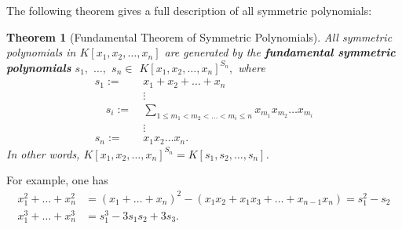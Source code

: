 \documentclass[11pt]{book}
\newtheorem{theorem}{Theorem}[section]
\begin{document}
The following theorem gives a full description of all symmetric polynomials:
\begin{theorem}[Fundamental Theorem of Symmetric Polynomials] \label{thm-FTSP}
All symmetric polynomials in $K[x_1, x_2, \dots, x_n]$ are generated by the {\bf fundamental symmetric polynomials} 
$s_1,$ $\dots,$ $s_n \in$ $K[x_1, x_2, \dots, x_n]^{S_n},$ where
\begin{align*}
s_1 :=\ &x_1 + x_2 + \ldots + x_n \\
&\vdots \\ 
\quad s_i :=\ &\sum_{1 \leq m_1 < m_2 < \dots < m_i \leq n} x_{m_1}x_{m_2}\dots x_{m_i} \\
&\vdots \\  
s_n :=\ &x_1x_2 \ldots x_n.
\end{align*}
In other words, $K[x_1, x_2, \dots, x_n]^{S_n} = K[s_1, s_2, \dots, s_n]$.
\end{theorem}
For example, one has
\begin{align*}
x_1^2 + \dots + x_n^2 &= (x_1 + \dots + x_n)^2 - (x_1x_2 + x_1x_3 + \dots + x_{n-1}x_n) = s_1^2 - s_2 \\ 
x_1^3 + \dots + x_n^3 &= s_1^3 - 3s_1s_2 + 3s_3.
\end{align*}





\end{document}
